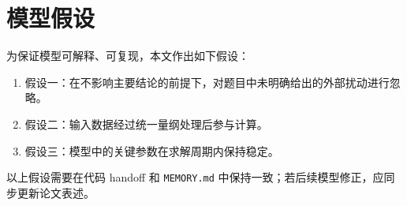 \section{模型假设}
\label{sec:assumptions}

为保证模型可解释、可复现，本文作出如下假设：
\begin{enumerate}
  \item 假设一：在不影响主要结论的前提下，对题目中未明确给出的外部扰动进行忽略。
  \item 假设二：输入数据经过统一量纲处理后参与计算。
  \item 假设三：模型中的关键参数在求解周期内保持稳定。
\end{enumerate}

以上假设需要在代码 handoff 和 \texttt{MEMORY.md} 中保持一致；若后续模型修正，应同步更新论文表述。
